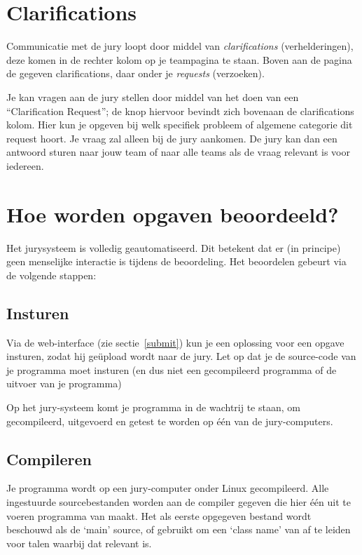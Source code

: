 \section{Clarifications}

Communicatie met de jury loopt door middel van \emph{clarifications}
(verhelderingen), deze komen in de rechter kolom op je teampagina te
staan. Boven aan de pagina de gegeven clarifications, daar onder je
\emph{requests} (verzoeken).

Je kan vragen aan de jury stellen door middel van het doen van een
``Clarification Request''; de knop hiervoor bevindt zich bovenaan de
clarifications kolom. Hier kun je opgeven bij welk specifiek probleem
of algemene categorie dit request hoort. Je vraag zal alleen bij de
jury aankomen. De jury kan dan een antwoord sturen naar jouw team of
naar alle teams als de vraag relevant is voor iedereen.

\section{Hoe worden opgaven beoordeeld?}\label{howjudged}

Het \DOMjudge jurysysteem is volledig geautomatiseerd. Dit betekent
dat er (in principe) geen menselijke interactie is tijdens de
beoordeling. Het beoordelen gebeurt via de volgende stappen:

\subsection{Insturen}

Via%
de web-interface (zie sectie~\ref{submit}) kun je een oplossing voor
een opgave insturen, zodat hij ge\"upload wordt naar de jury. Let op
dat je de source-code van je programma moet insturen (en dus niet een
gecompileerd programma of de uitvoer van je programma)

Op het jury-systeem komt je programma in de wachtrij te staan, om gecompileerd,
uitgevoerd en getest te worden op \'e\'en van de jury-computers.

\subsection{Compileren}

Je programma wordt op een jury-computer onder Linux gecompileerd.
Alle ingestuurde sourcebestanden worden aan de compiler gegeven die
hier \'e\'en uit te voeren programma van maakt. Het als eerste
opgegeven bestand wordt beschouwd als de `main' source, of gebruikt om
een `class name' van af te leiden voor talen waarbij dat relevant is.

